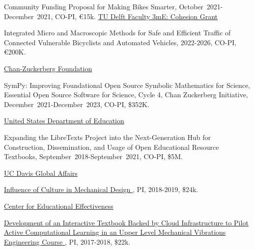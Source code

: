 \documentclass[10pt]{article}
\newenvironment{innerlist}[1][\enskip\textbullet]%
        {\begin{compactitem}[#1]}{\end{compactitem}}
\newcommand{\blankline}{\quad\pagebreak[2]}
\begin{document}
\begin{innerlist}
\item Community Funding Proposal for Making Bikes Smarter,
  October~2021-December~2021, CO-PI, \euro15k.
\href{}{TU Delft Faculty 3mE: Cohesion Grant}
\begin{innerlist}
  \item Integrated Micro and Macroscopic Methods for Safe and Efficient Traffic
    of Connected Vulnerable Bicyclists and Automated Vehicles, 2022-2026,
    CO-PI, \euro200K.
\end{innerlist}

\blankline

\href{https://www.chanzuckerberg.com}{Chan-Zuckerberg Foundation}
\begin{innerlist}
\item SymPy: Improving Foundational Open Source Symbolic Mathematics for
  Science, Essential Open Source Software for Science, Cycle 4, Chan Zuckerberg
  Initiative, December~2021-December~2023, CO-PI, \$352K.
\end{innerlist}

\blankline

\href{https://www.ed.gov}{United States Department of Education}
\begin{innerlist}
\item Expanding the LibreTexts Project into the Next-Generation Hub for
  Construction, Dissemination, and Usage of Open Educational Resource
  Textbooks, September~2018-September~2021, CO-PI, \$5M.
\end{innerlist}

\blankline

\href{https://globalaffairs.ucdavis.edu}{UC Davis Global Affairs}
\begin{innerlist}
\item \href{https://doi.org/10.6084/m9.figshare.5656105}{
      Influence of Culture in Mechanical Design
    }, PI, 2018-2019, \$24k.
\end{innerlist}

\blankline

\href{http://cee.ucdavis.edu/}{Center for Educational Effectiveness}
\begin{innerlist}
\item \href{https://doi.org/10.6084/m9.figshare.5229886.v1}{
      Development of an Interactive Textbook Backed by Cloud Infrastructure to
      Pilot Active Computational Learning in an Upper Level Mechanical
      Vibrations Engineering Course
    }, PI, 2017-2018, \$22k.
\end{innerlist}


\end{innerlist}
\end{document}
